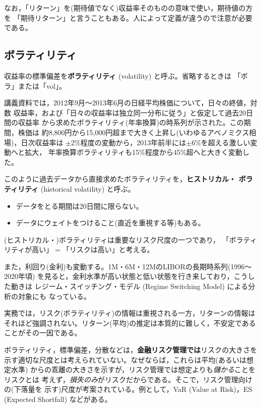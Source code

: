 なお，「リターン」を(期待値でなく)収益率そのものの意味で使い，期待値の方を
「期待リターン」と言うこともある。人によって定義が違うので注意が必要である。

\subsection{ボラティリティ}

\begin{definition}[ボラティリティ]
収益率の標準偏差を\textbf{ボラティリティ} (volatility) と呼ぶ。省略するときは
「ボラ」または「vol」。
\end{definition}

講義資料では，2012年9月〜2013年6月の日経平均株価について，日々の終値，対数
収益率，および「日々の収益率は独立同一分布に従う」と仮定して過去20日間の収益率
から求めたボラティリティ(年率換算)の時系列が示された。この期間，株価は
約8,800円から15,000円超まで大きく上昇し(いわゆるアベノミクス相場)，日次収益率は
$\pm 2\%$程度の変動から，2013年前半には$\pm 6\%$を超える激しい変動へと拡大，
年率換算ボラティリティも15\%程度から45\%超へと大きく変動した。

このように過去データから直接求めたボラティリティを，\textbf{ヒストリカル・
ボラティリティ} (historical volatility) と呼ぶ。
\begin{itemize}
\item データをとる期間は20日間に限らない。
\item データにウェイトをつけること(直近を重視する等)もある。
\end{itemize}
(ヒストリカル・)ボラティリティは重要なリスク尺度の一つであり，
「ボラティリティが高い」$=$「リスクは高い」と考える。

また，利回り(金利)も変動する。1M・6M・12MのLIBORの長期時系列(1996〜2020年頃)
を見ると，金利水準が高い状態と低い状態を行き来しており，こうした動きは
レジーム・スイッチング・モデル (Regime Switching Model) による分析の対象にも
なっている。

実務では，リスク(ボラティリティ)の情報は重視される一方，リターンの情報は
それほど強調されない。リターン(平均)の推定は本質的に難しく，不安定である
ことがその一因である。

\begin{remark}[金融リスク管理におけるリスク]
ボラティリティ，標準偏差，分散などは，\textbf{金融リスク管理では}リスクの大きさを
示す適切な尺度とは考えられていない。なぜならば，これらは平均(あるいは想定水準)
からの乖離の大きさを示すが，リスク管理では想定よりも\emph{儲かる}ことをリスクとは
考えず，\emph{損失のみ}がリスクだからである。そこで，リスク管理向けの(下落量を
示す)尺度が考案されている。例として，VaR (Value at Risk)，ES (Expected
Shortfall) などがある。
\end{remark}


